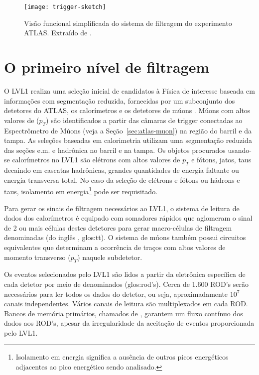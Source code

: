 \begin{figure}
\begin{center}
\texttt{[image: trigger-sketch]}
\end{center}
\caption[Visão funcional simplificada do sistema de filtragem do experimento
ATLAS.]{Visão funcional simplificada do sistema de filtragem do experimento
ATLAS. Extraído de \cite{hlt-tdr}.}
\label{fig:trigger-sketch}
\end{figure}

\section{O primeiro nível de filtragem}
\label{sec:lvl1}

O LVL1 realiza uma seleção inicial de candidatos à Física de interesse baseada
em informações com segmentação reduzida, fornecidas por um subconjunto dos
detetores do ATLAS, os calorímetros e os detetores de múons
\cite{l1-tdr}. Múons com altos valores de  ($p_T$) são
identificados a partir das câmaras de trigger conectadas ao Espectrômetro de
Múons (veja a Seção~\ref{sec:atlas-muon}) na região do barril e da tampa. As
seleções baseadas em calorimetria utilizam uma segmentação reduzida das seções
e.m. e hadrônica no barril e na tampa. Os objetos procurados usando-se
calorímetros no LVL1 são elétrons com altos valores de $p_T$ e fótons, jatos,
taus decaindo em cascatas hadrônicas, grandes quantidades de energia faltante
ou energia transversa total. No caso da seleção de elétrons e fótons ou
hádrons e taus, isolamento em energia\footnote{Isolamento em energia significa
a ausência de outros picos energéticos adjacentes ao pico energético sendo
analisado.} pode ser requisitado.

Para gerar os sinais de filtragem necessários ao LVL1, o sistema de leitura de
dados dos calorímetros é equipado com somadores rápidos \cite{seixas:adder,
lar-tdr} que aglomeram o sinal de 2 ou mais células destes detetores para
gerar macro-células de filtragem denominadas  (do
inglês , \gls{glos:tt}). O sistema de múons também possui
circuitos equivalentes que determinam a ocorrência de traços com altos valores
de momento transverso ($p_T$) naquele subdetetor.

Os eventos selecionados pelo LVL1 são lidos a partir da eletrônica específica
de cada detetor por meio de  denominados 
(\gls{glos:rod}'s). Cerca de 1.600 ROD's serão necessários para ler todos os
dados do detetor, ou seja, aproximadamente $10^7$ canais independentes. Vários
canais de leitura são multiplexados em cada ROD. Bancos de memória primários,
chamados de , garantem um fluxo contínuo dos dados aos
ROD's, apesar da irregularidade da aceitação de eventos proporcionada pelo
LVL1.

